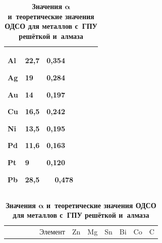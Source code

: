 \begin{table}[t!]
\begin{minipage}{.88\textwidth}
\begin{tabular}{p{1.8cm}|p{1.4cm}|p{1.4cm}|p{1.8cm}|p{1.4cm}|p{1.4cm}}
Al \par Ag \par Au \par Cu \par Ni \par Pd \par Pt \par Pb& \centering

22,7 \par 19 \par 14 \par 16,5 \par 13,5 \par 11,6 \par 9 \par 28,5& {\centering

0,354 \par 0,284 \par 0,197 \par 0,242 \par 0,195 \par 0,163 \par 0,120 \par }~~0,478 \\

\hline

\end{tabular}

\end{minipage}





\smallskip

\bigskip

\centering

\begin{minipage}{.88\textwidth}

\centering

\caption{\bf Значения $\boldsymbol \alpha $ и~теоретические значения ОДСО для металлов с~ГПУ решёткой и~алмаза} \vspace{-3mm}

\begin{tabular}{p{3.8cm}|c|c|c|c|c|c}

\hline

~~~~~~~~~Элемент& 

Zn& 

Mg& 

Sn& 

Bi& 

Co& 

C \\


\end{tabular}
\end{minipage}
\end{table}
